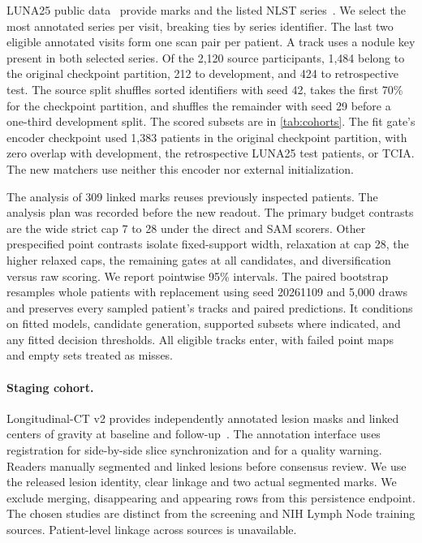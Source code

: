 LUNA25 public data~\cite{peeters2026,lunamarks,lunascans} provide marks and the listed NLST series~\cite{nlstct}. We select the most annotated series per visit, breaking ties by series identifier. The last two eligible annotated visits form one scan pair per patient. A track uses a nodule key present in both selected series. Of the 2,120 source participants, 1,484 belong to the original checkpoint partition, 212 to development, and 424 to retrospective test. The source split shuffles sorted identifiers with seed 42, takes the first 70\% for the checkpoint partition, and shuffles the remainder with seed 29 before a one-third development split. The scored subsets are in \cref{tab:cohorts}. The fit gate's encoder checkpoint used 1,383 patients in the original checkpoint partition, with zero overlap with development, the retrospective LUNA25 test patients, or TCIA. The new matchers use neither this encoder nor external initialization.

The analysis of 309 linked marks reuses previously inspected patients. The analysis plan was recorded before the new readout. The primary budget contrasts are the wide strict cap 7 to 28 under the direct and SAM scorers. Other prespecified point contrasts isolate fixed-support width, relaxation at cap 28, the higher relaxed caps, the remaining gates at all candidates, and diversification versus raw scoring. We report pointwise 95\% intervals. The paired bootstrap resamples whole patients with replacement using seed 20261109 and 5,000 draws and preserves every sampled patient's tracks and paired predictions. It conditions on fitted models, candidate generation, supported subsets where indicated, and any fitted decision thresholds. All eligible tracks enter, with failed point maps and empty sets treated as misses.

\paragraph{Staging cohort.}
Longitudinal-CT v2 provides independently annotated lesion masks and linked centers of gravity at baseline and follow-up~\cite{gatidis2026longct,kuestner2025longct}. The annotation interface uses registration for side-by-side slice synchronization and for a quality warning. Readers manually segmented and linked lesions before consensus review. We use the released lesion identity, clear linkage and two actual segmented marks. We exclude merging, disappearing and appearing rows from this persistence endpoint. The chosen studies are distinct from the screening and NIH Lymph Node training sources. Patient-level linkage across sources is unavailable.


